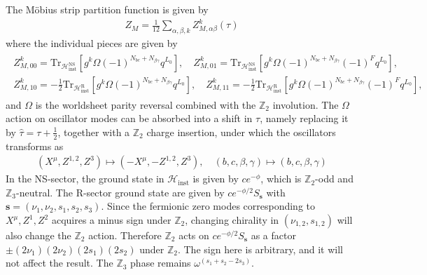 \documentclass[12pt]{article}
\newcommand{\ie}{\begin{equation}\begin{aligned}}
\newcommand{\fe}{\end{aligned}\end{equation}}
\begin{document}
The M\"obius strip partition function is given by
\ie
Z_M = \frac{1}{12}\sum_{\alpha, \beta, k} Z_{M,\alpha\beta}^k(\tau)
\fe
where the individual pieces are given by
\ie \begin{gathered}
Z_{M,00}^k = \mathrm{Tr}_{\mathcal{H}^{\text{NS}}_{\text{inst}}}[g^k\Omega (-1)^{N_{bc}+N_{\beta\gamma}} q^{L_0}],\quad Z_{M,01}^k = \mathrm{Tr}_{\mathcal{H}^{\text{NS}}_{\text{inst}}}[g^k\Omega (-1)^{N_{bc}+N_{\beta\gamma}}(-1)^Fq^{L_0}],\\
Z_{M,10}^k= -\frac{1}{2}\mathrm{Tr}_{ \mathcal{H}^{\text{R}}_{\text{inst}}}[g^k\Omega(-1)^{N_{bc}+N_{\beta\gamma}}q^{L_0}],\quad Z_{M,11}^k = -\frac{1}{2}\mathrm{Tr}_{\mathcal{H}^{\text{R}}_{\text{inst}}}[g^k\Omega(-1)^{N_{bc}+N_{\beta\gamma}} (-1)^F q^{L_0}],
\end{gathered}\fe
and $\Omega$ is the worldsheet parity reversal combined with the $\mathbb{Z}_2$ involution. The $\Omega$ action on oscillator modes can be absorbed into a shift in $\tau$, namely replacing it by $\hat{\tau}=\tau+\frac{1}{2}$, together with a $\mathbb{Z}_2$ charge insertion, under which the oscillators transforms as
\ie
(X^\mu, Z^{1,2}, Z^3)\mapsto (-X^\mu, -Z^{1,2}, Z^3),\quad (b,c,\beta,\gamma) \mapsto (b,c,\beta,\gamma)
\fe
In the NS-sector, the ground state in $\mathcal{H}_\text{inst}$ is given by $ce^{-\phi}$, which is $\mathbb{Z}_2$-odd and $\mathbb{Z}_3$-neutral. The R-sector ground state are given by $ce^{-\phi/2}S_{\mathbf{s}}$ with $\mathbf{s}=(\nu_1, \nu_2, s_1, s_2, s_3)$. Since the fermionic zero modes corresponding to $X^\mu,Z^1,Z^2$ acquires a minus sign under $\mathbb{Z}_2$, changing chirality in $(\nu_{1,2}, s_{1,2})$ will also change the $\mathbb{Z}_2$ action. Therefore $\mathbb{Z}_2$ acts on $ce^{-\phi/2}S_{\mathbf{s}}$ as a factor $\pm(2\nu_1)(2\nu_2)(2s_1)(2s_2)$ under $\mathbb{Z}_2$. The sign here is arbitrary, and it will not affect the result. The $\mathbb{Z}_3$ phase remains $\omega^{(s_1+s_2-2s_3)}$.
\end{document}
